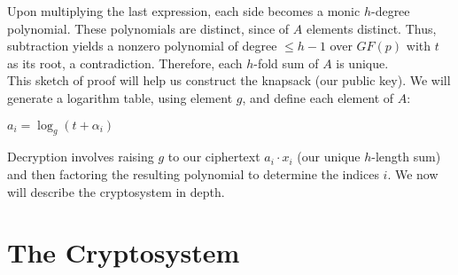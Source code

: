 \documentclass[12pt,a4paper,titlepage]{article}
\begin{document}
Upon multiplying the last expression, each side becomes a monic $h$-degree polynomial. These polynomials are distinct, since of $A$ elements distinct. Thus, subtraction yields a nonzero polynomial of degree $\le h - 1$ over $GF(p)$ with $t$ as its root, a contradiction.  Therefore, each $h$-fold sum of $A$ is unique.\\
\newpage
This sketch of proof will help us construct the knapsack (our public key). We will generate a logarithm table, using element $g$, and define each element of $A$: \\ \centerline{$a_i =  \log_g (t + \alpha_i)$} Decryption involves raising $g$ to our ciphertext $a_i \cdot x_i $ (our unique $h$-length sum) and then factoring the resulting polynomial to determine the indices $i$. We now will describe the cryptosystem in depth.
 



\section{The Cryptosystem}
\end{document}
